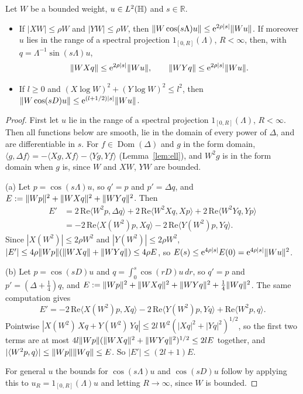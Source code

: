 \begin{lemma}\label{lem:wave}
Let $W$ be a bounded weight, $u\in L^2(\mathbb{H})$ and $s\in\mathbb R$.
\begin{itemize}
\item[(a)] If $|XW|\le\rho W$ and $|YW|\le\rho W$, then $\lVert W\cos(s\Lambda)u\rVert\le\mathrm{e}^{2\rho|s|}\lVert Wu\rVert$. If moreover $u$ lies in the
range of a spectral projection $1_{[0,R]}(\Lambda)$, $R<\infty$, then, with $q=\Lambda^{-1}\sin(s\Lambda)u$,
\[
\lVert WXq\rVert\le\mathrm{e}^{2\rho|s|}\lVert Wu\rVert,\qquad\lVert WYq\rVert\le\mathrm{e}^{2\rho|s|}\lVert Wu\rVert.
\]
\item[(b)] If $l\ge0$ and $(X\log W)^2+(Y\log W)^2\le l^2$, then $\lVert W\cos(sD)u\rVert\le\mathrm{e}^{(l+1/2)|s|}\lVert Wu\rVert$.
\end{itemize}
\end{lemma}
\begin{proof}
First let $u$ lie in the range of a spectral projection $1_{[0,R]}(\Lambda)$, $R<\infty$. Then all functions below are smooth, lie in the domain of
every power of $\Delta$, and are differentiable in $s$. For $f\in\operatorname{Dom}(\Delta)$ and $g$ in the form domain,
$\langle g,\Delta f\rangle=-\langle Xg,Xf\rangle-\langle Yg,Yf\rangle$ (Lemma~\ref{lem:ell}), and $W^2g$ is in the form domain when $g$ is,
since $W$ and $XW$, $YW$ are bounded.

(a) Let $p=\cos(s\Lambda)u$, so $q'=p$ and $p'=\Delta q$, and $E:=\lVert Wp\rVert^2+\lVert WXq\rVert^2+\lVert WYq\rVert^2$. Then
\begin{align*}
E'&=2\,\mathrm{Re}\langle W^2p,\Delta q\rangle+2\,\mathrm{Re}\langle W^2Xq,Xp\rangle+2\,\mathrm{Re}\langle W^2Yq,Yp\rangle\\
&=-2\,\mathrm{Re}\langle X(W^2)p,Xq\rangle-2\,\mathrm{Re}\langle Y(W^2)p,Yq\rangle .
\end{align*}
Since $|X(W^2)|\le2\rho W^2$ and $|Y(W^2)|\le2\rho W^2$, $|E'|\le4\rho\lVert Wp\rVert(\lVert WXq\rVert+\lVert WYq\rVert)\le4\rho E$, so
$E(s)\le\mathrm{e}^{4\rho|s|}E(0)=\mathrm{e}^{4\rho|s|}\lVert Wu\rVert^2$.

(b) Let $p=\cos(sD)u$ and $q=\int_0^s\cos(rD)u\,dr$, so $q'=p$ and $p'=(\Delta+\tfrac14)q$, and
$E:=\lVert Wp\rVert^2+\lVert WXq\rVert^2+\lVert WYq\rVert^2+\tfrac14\lVert Wq\rVert^2$. The same computation gives
\[E'=-2\,\mathrm{Re}\langle X(W^2)p,Xq\rangle-2\,\mathrm{Re}\langle Y(W^2)p,Yq\rangle+\mathrm{Re}\langle W^2p,q\rangle.\]
Pointwise
$|X(W^2)\,Xq+Y(W^2)\,Yq|\le2l\,W^2(|Xq|^2+|Yq|^2)^{1/2}$, so the first two terms are at most
$4l\lVert Wp\rVert(\lVert WXq\rVert^2+\lVert WYq\rVert^2)^{1/2}\le2lE$ together, and $|\langle W^2p,q\rangle|\le\lVert Wp\rVert\lVert Wq\rVert\le E$. So $|E'|\le(2l+1)E$.

For general $u$ the bounds for $\cos(s\Lambda)u$ and $\cos(sD)u$ follow by applying this to $u_R=1_{[0,R]}(\Lambda)u$ and letting
$R\to\infty$, since $W$ is bounded.
\end{proof}

